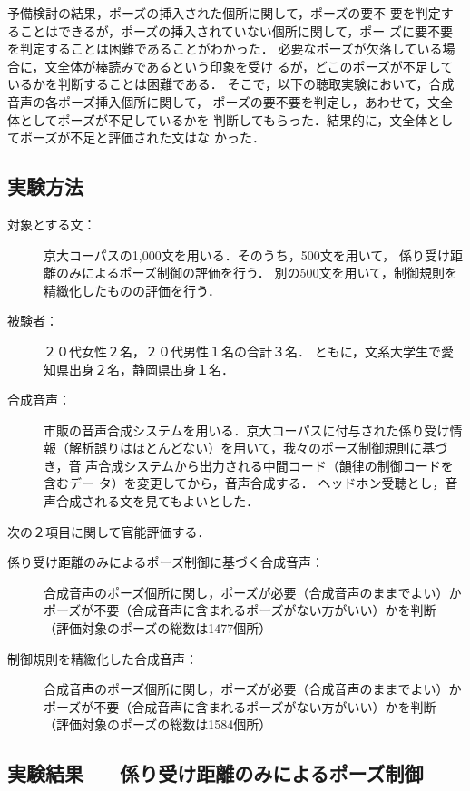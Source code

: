 予備検討の結果，ポーズの挿入された個所に関して，ポーズの要不
要を判定することはできるが，ポーズの挿入されていない個所に関して，ポー
ズに要不要を判定することは困難であることがわかった．
必要なポーズが欠落している場合に，文全体が棒読みであるという印象を受け
るが，どこのポーズが不足しているかを判断することは困難である．
そこで，以下の聴取実験において，合成音声の各ポーズ挿入個所に関して，
ポーズの要不要を判定し，あわせて，文全体としてポーズが不足しているかを
判断してもらった．結果的に，文全体としてポーズが不足と評価された文はな
かった．

\subsection{実験方法}

\begin{description}
  \item[対象とする文：]
   京大コーパスの1,000文を用いる．そのうち，500文を用いて，
   係り受け距離のみによるポーズ制御の評価を行う．
   別の500文を用いて，制御規則を精緻化したものの評価を行う．

  \item[被験者：]
   ２０代女性２名，２０代男性１名の合計３名．
   ともに，文系大学生で愛知県出身２名，静岡県出身１名．

  \item[合成音声：]
   市販の音声合成システムを用いる．京大コーパスに付与された係り受け情
   報（解析誤りはほとんどない）を用いて，我々のポーズ制御規則に基づき，音
   声合成システムから出力される中間コード（韻律の制御コードを含むデー
   タ）を変更してから，音声合成する．
   ヘッドホン受聴とし，音声合成される文を見てもよいとした．
\end{description}

次の２項目に関して官能評価する．
\begin{description}
   \item[係り受け距離のみによるポーズ制御に基づく合成音声：]
	合成音声のポーズ個所に関し，ポーズが必要（合成音声のままでよい）か
	 ポーズが不要（合成音声に含まれるポーズがない方がいい）かを判断
	 （評価対象のポーズの総数は1477個所）
   \item[制御規則を精緻化した合成音声：]
	 合成音声のポーズ個所に関し，ポーズが必要（合成音声のままでよい）か
	 ポーズが不要（合成音声に含まれるポーズがない方がいい）かを判断
	 （評価対象のポーズの総数は1584個所）
\end{description}

\subsection{実験結果 — 係り受け距離のみによるポーズ制御 —}

